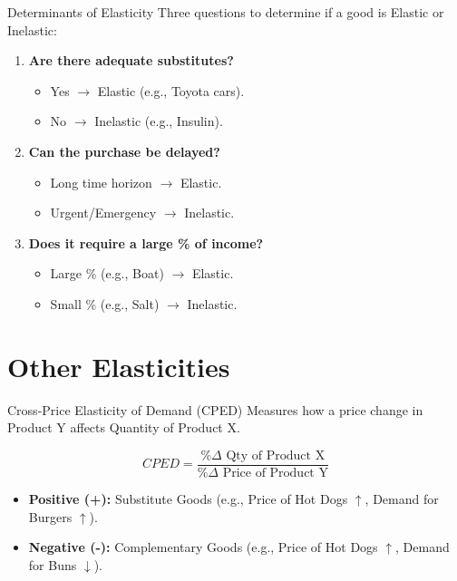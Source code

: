 \documentclass[aspectratio=169]{beamer}
\begin{document}
\begin{frame}{Determinants of Elasticity}
    Three questions to determine if a good is Elastic or Inelastic:
    \begin{enumerate}
        \item \textbf{Are there adequate substitutes?}
        \begin{itemize}
            \item Yes $\rightarrow$ Elastic (e.g., Toyota cars).
            \item No $\rightarrow$ Inelastic (e.g., Insulin).
        \end{itemize}
        \item \textbf{Can the purchase be delayed?}
        \begin{itemize}
            \item Long time horizon $\rightarrow$ Elastic.
            \item Urgent/Emergency $\rightarrow$ Inelastic.
        \end{itemize}
        \item \textbf{Does it require a large \% of income?}
        \begin{itemize}
            \item Large \% (e.g., Boat) $\rightarrow$ Elastic.
            \item Small \% (e.g., Salt) $\rightarrow$ Inelastic.
        \end{itemize}
    \end{enumerate}
\end{frame}

\section{Other Elasticities}

\begin{frame}{Cross-Price Elasticity of Demand (CPED)}
    Measures how a price change in Product Y affects Quantity of Product X.
    
    \[ CPED = \frac{\% \Delta \text{ Qty of Product X}}{\% \Delta \text{ Price of Product Y}} \]
    
    \begin{itemize}
        \item \textbf{Positive (+):} Substitute Goods (e.g., Price of Hot Dogs $\uparrow$, Demand for Burgers $\uparrow$).
        \item \textbf{Negative (-):} Complementary Goods (e.g., Price of Hot Dogs $\uparrow$, Demand for Buns $\downarrow$).
    \end{itemize}
\end{frame}
\end{document}
